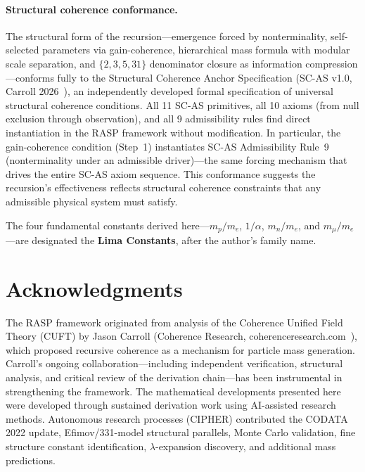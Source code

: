 \documentclass[12pt,a4paper]{article}
\theoremstyle{definition}
\begin{document}
\paragraph{Structural coherence conformance.}
The structural form of the recursion---emergence forced by nonterminality,
self-selected parameters via gain-coherence, hierarchical mass formula with
modular scale separation, and $\{2,3,5,31\}$ denominator closure as
information compression---conforms fully to the Structural Coherence Anchor
Specification (SC-AS v1.0, Carroll 2026~\cite{carroll2026}), an independently
developed formal specification of universal structural coherence conditions.
All 11 SC-AS primitives, all 10 axioms (from null exclusion through
observation), and all 9 admissibility rules find direct instantiation in the
RASP framework without modification. In particular, the gain-coherence
condition (Step~1) instantiates SC-AS Admissibility Rule~9 (nonterminality
under an admissible driver)---the same forcing mechanism that drives the
entire SC-AS axiom sequence. This conformance suggests the recursion's
effectiveness reflects structural coherence constraints that any admissible
physical system must satisfy.

The four fundamental constants derived here---$m_p/m_e$, $1/\alpha$,
$m_n/m_e$, and $m_\mu/m_e$---are designated the \textbf{Lima Constants},
after the author's family name.

\section*{Acknowledgments}

The RASP framework originated from analysis of the Coherence Unified
Field Theory (CUFT) by Jason Carroll (Coherence Research,
coherenceresearch.com~\cite{carroll2026}), which proposed recursive
coherence as a mechanism for particle mass generation. Carroll's ongoing
collaboration---including independent verification, structural analysis,
and critical review of the derivation chain---has been instrumental in
strengthening the framework. The mathematical developments presented
here were developed through sustained derivation work using AI-assisted
research methods. Autonomous research processes (CIPHER) contributed the
CODATA 2022 update, Efimov/331-model structural parallels, Monte Carlo
validation, fine structure constant identification, $\lambda$-expansion
discovery, and additional mass predictions.
\end{document}
